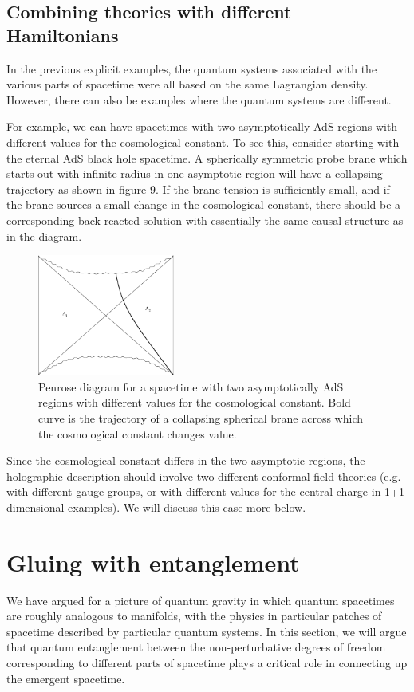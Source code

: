 \documentclass[12pt,epsf]{article}
\renewcommand{\(}{\left(}
\renewcommand{\)}{\right)}
\begin{document}
\subsection{Combining theories with different Hamiltonians}

In the previous explicit examples, the quantum systems associated with the various parts of spacetime were all based on the same Lagrangian density. However, there can also be examples where the quantum systems are different.

For example, we can have spacetimes with two asymptotically AdS regions with different values for the cosmological constant. To see this, consider starting with the eternal AdS black hole spacetime. A spherically symmetric probe brane which starts out with infinite radius in one asymptotic region will have a collapsing trajectory as shown in figure 9. If the brane tension is sufficiently small, and if the brane sources a small change in the cosmological constant, there should be a corresponding back-reacted solution with essentially the same causal structure as in the diagram.
\begin{figure}
\centering
\includegraphics[width=0.4\textwidth]{penrose3.eps}
\caption{Penrose diagram for a spacetime with two asymptotically AdS regions with different values for the cosmological constant. Bold curve is the trajectory of a collapsing spherical brane across which the cosmological constant changes value.}
\end{figure}
Since the cosmological constant differs in the two asymptotic regions, the holographic description should involve two different conformal field theories (e.g. with different gauge groups, or with different values for the central charge in 1+1 dimensional examples). We will discuss this case more below.

\section{Gluing with entanglement}

We have argued for a picture of quantum gravity in which quantum spacetimes are roughly analogous to manifolds, with the physics in particular patches of spacetime described by particular quantum systems. In this section, we will argue that quantum entanglement between the non-perturbative degrees of freedom corresponding to different parts of spacetime plays a critical role in connecting up the emergent spacetime.
\end{document}
